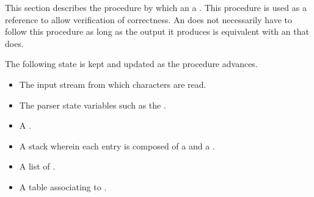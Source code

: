 This section describes the procedure by which an   a . This procedure is used as a reference to allow verification of correctness. An  does not necessarily have to follow this procedure as long as the output it produces is equivalent with an  that does.

The following state is kept and updated as the procedure advances.

\begin{itemize}
\item The input stream from which characters are read.
\item The parser state variables such as the .
\item A .
\item A stack wherein each entry is composed of a  and a .
\item A list of .
\item A table associating  to .
\end{itemize}

